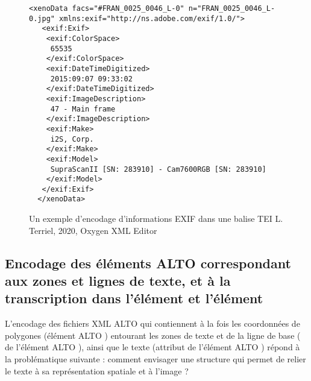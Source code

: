 \begin{figure}[h]
\lstset{language=XML}
\begin{lstlisting}
<xenoData facs="#FRAN_0025_0046_L-0" n="FRAN_0025_0046_L-0.jpg" xmlns:exif="http://ns.adobe.com/exif/1.0/">
   <exif:Exif>
    <exif:ColorSpace>
     65535
    </exif:ColorSpace>
    <exif:DateTimeDigitized>
     2015:09:07 09:33:02
    </exif:DateTimeDigitized>
    <exif:ImageDescription>
     47 - Main frame
    </exif:ImageDescription>
    <exif:Make>
     i2S, Corp.
    </exif:Make>
    <exif:Model>
     SupraScanII [SN: 283910] - Cam7600RGB [SN: 283910]
    </exif:Model>
   </exif:Exif>
  </xenoData>
\end{lstlisting} 
\caption{Un exemple d'encodage d'informations EXIF dans une balise TEI   \textcopyright L. Terriel, 2020, Oxygen XML Editor}
\label{fig:sortie_exif_xml}
\end{figure}
\newpage

\subsection{Encodage des éléments ALTO correspondant aux zones et lignes de texte, et à la transcription dans l'élément  et l'élément }

L'encodage des fichiers XML ALTO qui contiennent à la fois les coordonnées de polygones (élément ALTO ) entourant les zones de texte et de la ligne de base ( de l'élément ALTO ), ainsi que le texte (attribut  de l'élément ALTO ) répond à la problématique suivante : comment envisager une structure qui permet de relier le texte à sa représentation spatiale et à l'image ?\\

